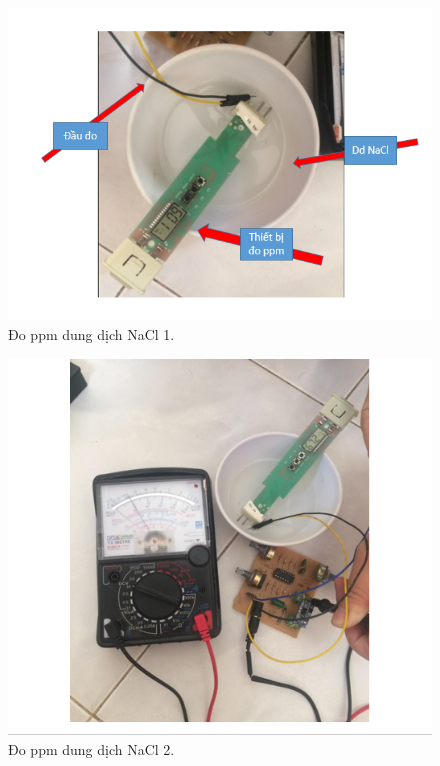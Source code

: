\documentclass[a4paper,12pt,oneside]{article}
\begin{document}
\begin{itemize}
\begin{itemize}
\begin{figure}[H]
\begin{center}
	\includegraphics[scale=.8]{hinh/PPM/nacl_1.PNG}
	\end{center}
	\caption{Đo ppm dung dịch NaCl 1.}
	\end{figure}
	
	\begin{figure}[H]
	\begin{center}
	\includegraphics[scale=.8]{hinh/PPM/nacl_2.PNG}
	\end{center}
	\caption{Đo ppm dung dịch NaCl 2.}
	\end{figure}
	

\end{itemize}
\end{itemize}
\end{document}
